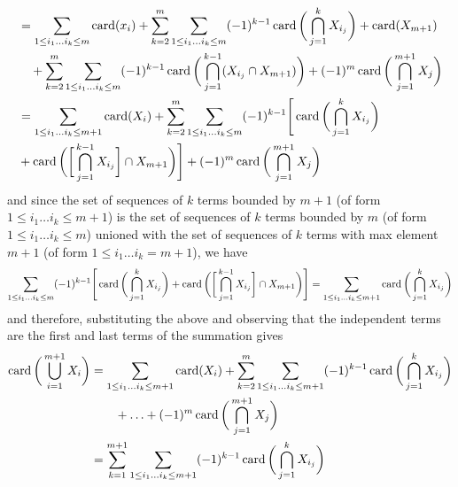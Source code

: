 \begin{solution}
\begin{align*}
      & = \sum_{1 \leq i_1 \ldots i_k \leq m} \operatorname*{card}(x_i) + \sum_{k=2}^m \sum_{1 \leq i_1 \ldots i_k \leq m} (-1)^{k-1} \operatorname*{card}\bigg( \bigcap_{j=1}^k X_{i_j} \bigg) + \operatorname*{card}(X_{m+1})\\
      & \quad + \sum_{k=2}^{m} \sum_{1 \leq i_1 \ldots i_k \leq m} (-1)^{k-1} \operatorname*{card}\bigg( \bigcap_{j=1}^{k-1} (X_{i_j} \cap X_{m+1}) \bigg) + (-1)^{m} \operatorname*{card}\bigg( \bigcap_{j=1}^{m+1} X_j \bigg) \\
      & = \sum_{1 \leq i_1 \ldots i_k \leq m+1} \operatorname*{card}(X_i) + \sum_{k=2}^m \sum_{1 \leq i_1 \ldots i_k \leq m} (-1)^{k-1} \Bigg[ \operatorname*{card}\bigg( \bigcap_{j=1}^k X_{i_j} \bigg) \\
      & +  \operatorname*{card}\bigg( \bigg[ \bigcap_{j=1}^{k-1} X_{i_j} \bigg] \cap X_{m+1} \bigg) \Bigg] + (-1)^{m} \operatorname*{card}\bigg( \bigcap_{j=1}^{m+1} X_j \bigg) 
    \end{align*}
    and since the set of sequences of $k$ terms bounded by $m+1$ (of form $1 \leq i_1 \ldots i_k \leq m+1$) is the set of sequences of $k$ terms bounded by $m$ (of form $1 \leq i_1 \ldots i_k \leq m$) unioned with the set of sequences of $k$ terms with max element $m+1$ (of form $1 \leq i_1 \ldots i_k = m+1$), we have 
    \begin{equation}
      \sum_{1 \leq i_1 \ldots i_k \leq m} (-1)^{k-1} \Bigg[ \operatorname*{card}\bigg( \bigcap_{j=1}^k X_{i_j} \bigg) +  \operatorname*{card}\bigg( \bigg[ \bigcap_{j=1}^{k-1} X_{i_j} \bigg] \cap X_{m+1} \bigg) \Bigg] = \sum_{1 \leq i_1 \ldots i_k \leq m+1} \operatorname*{card}\bigg( \bigcap_{j=1}^k X_{i_j} \bigg)
    \end{equation}
    and therefore, substituting the above and observing that the independent terms are the first and last terms of the summation gives 
    \begin{align*}
      \operatorname*{card} \bigg( \bigcup_{i=1}^{m+1} X_i \bigg) & = \sum_{1 \leq i_1 \ldots i_k \leq m+1} \operatorname*{card}(X_i) + \sum_{k=2}^m \sum_{1 \leq i_1 \ldots i_k \leq m+1} (-1)^{k-1} \operatorname*{card}\bigg( \bigcap_{j=1}^k X_{i_j} \bigg) \\ 
      & \qquad + \ldots + (-1)^{m} \operatorname*{card}\bigg( \bigcap_{j=1}^{m+1} X_j \bigg) \\
      & = \sum_{k=1}^{m+1} \sum_{1 \leq i_1 \ldots i_k \leq m+1} (-1)^{k-1} \operatorname*{card}\bigg( \bigcap_{j=1}^k X_{i_j} \bigg) 
    \end{align*}
  \end{solution}


